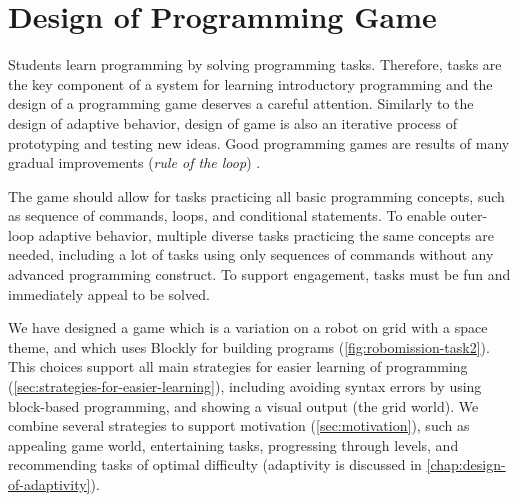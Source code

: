 \chapter{Design of Programming Game}
\label{chap:design-of-game}

Students learn programming by solving programming tasks.
Therefore, tasks are the key component of a system for learning introductory
programming and the design of a programming game deserves a careful attention.
Similarly to the design of adaptive behavior, design of game is also an iterative
process of prototyping and testing new ideas.
Good programming games are results of many gradual improvements
(\emph{rule of the loop}) \cite{book-of-lenses}.


The game should allow for tasks practicing all basic
programming concepts, such as sequence of commands, loops, and conditional
statements. %
To enable outer-loop adaptive behavior, multiple diverse tasks practicing the same
concepts are needed, including a lot of tasks using only sequences of commands
without any advanced programming construct.
To support engagement, tasks must be fun and immediately appeal to be
solved.  %


We have designed a game which is a variation on a robot
on grid with a space theme, and which uses Blockly for building programs
(\cref{fig:robomission-task2}).
This choices support all main strategies for easier learning of programming
(\cref{sec:strategies-for-easier-learning}),
including
avoiding syntax errors by using block-based programming, and
showing a visual output (the grid world).
We combine several strategies to support motivation (\cref{sec:motivation}),
such as appealing game world, entertaining tasks, progressing through levels,
and recommending tasks of optimal difficulty
(adaptivity is discussed in \cref{chap:design-of-adaptivity}).

